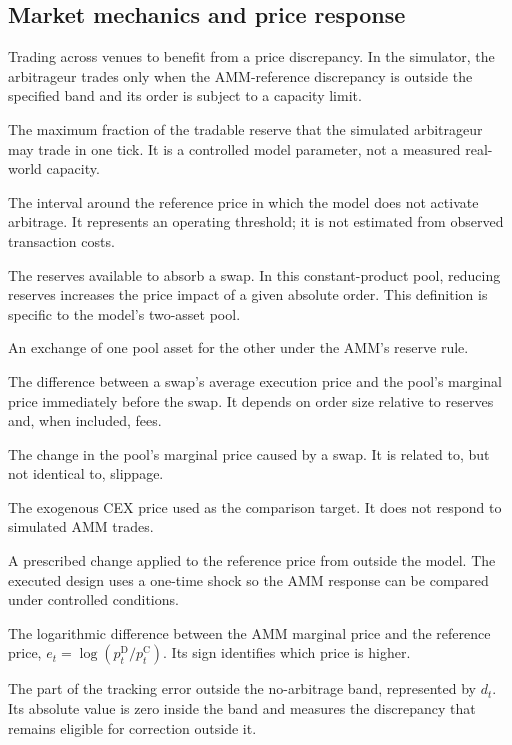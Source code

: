 \subsection*{Market mechanics and price response}
\begin{description}[style=unboxed,leftmargin=0pt,labelwidth=0pt,labelsep=0.5em,itemsep=0.1em]
  \item[Arbitrage:] Trading across venues to benefit from a price discrepancy. In the simulator, the arbitrageur trades only when the AMM-reference discrepancy is outside the specified band and its order is subject to a capacity limit.
  \item[Arbitrage capacity:] The maximum fraction of the tradable reserve that the simulated arbitrageur may trade in one tick. It is a controlled model parameter, not a measured real-world capacity.
  \item[No-arbitrage band:] The interval around the reference price in which the model does not activate arbitrage. It represents an operating threshold; it is not estimated from observed transaction costs.
  \item[Liquidity and depth:] The reserves available to absorb a swap. In this constant-product pool, reducing reserves increases the price impact of a given absolute order. This definition is specific to the model's two-asset pool.
  \item[Swap:] An exchange of one pool asset for the other under the AMM's reserve rule.
  \item[Slippage:] The difference between a swap's average execution price and the pool's marginal price immediately before the swap. It depends on order size relative to reserves and, when included, fees.
  \item[Price impact:] The change in the pool's marginal price caused by a swap. It is related to, but not identical to, slippage.
  \item[Reference price:] The exogenous CEX price used as the comparison target. It does not respond to simulated AMM trades.
  \item[Exogenous shock:] A prescribed change applied to the reference price from outside the model. The executed design uses a one-time shock so the AMM response can be compared under controlled conditions.
  \item[Tracking error:] The logarithmic difference between the AMM marginal price and the reference price, $e_t=\log(p^{\mathrm D}_t/p^{\mathrm C}_t)$. Its sign identifies which price is higher.
  \item[Excess error:] The part of the tracking error outside the no-arbitrage band, represented by $d_t$. Its absolute value is zero inside the band and measures the discrepancy that remains eligible for correction outside it.
\end{description}

